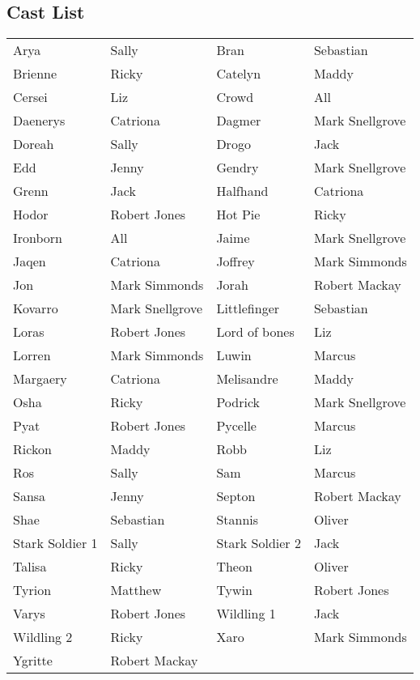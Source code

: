 \subsection*{Cast List}
\begin{tabular}{ll|ll}\\
Arya & Sally &  Bran & Sebastian\\
Brienne & Ricky &  Catelyn & Maddy\\
Cersei & Liz &  Crowd & All\\
Daenerys & Catriona &  Dagmer & Mark Snellgrove\\
Doreah & Sally &  Drogo & Jack\\
Edd & Jenny &  Gendry & Mark Snellgrove\\
Grenn & Jack &  Halfhand & Catriona\\
Hodor & Robert Jones &  Hot Pie & Ricky\\
Ironborn & All &  Jaime & Mark Snellgrove\\
Jaqen & Catriona &  Joffrey & Mark Simmonds\\
Jon & Mark Simmonds &  Jorah & Robert Mackay\\
Kovarro & Mark Snellgrove &  Littlefinger & Sebastian\\
Loras & Robert Jones &  Lord of bones & Liz\\
Lorren & Mark Simmonds &  Luwin & Marcus\\
Margaery & Catriona &  Melisandre & Maddy\\
Osha & Ricky &  Podrick & Mark Snellgrove\\
Pyat & Robert Jones &  Pycelle & Marcus\\
Rickon & Maddy &  Robb & Liz\\
Ros & Sally &  Sam & Marcus\\
Sansa & Jenny &  Septon & Robert Mackay\\
Shae & Sebastian &  Stannis & Oliver\\
Stark Soldier 1 & Sally &  Stark Soldier 2 & Jack\\
Talisa & Ricky &  Theon & Oliver\\
Tyrion & Matthew &  Tywin & Robert Jones\\
Varys & Robert Jones &  Wildling 1 & Jack\\
Wildling 2 & Ricky &  Xaro & Mark Simmonds\\
Ygritte & Robert Mackay &  \end{tabular}
